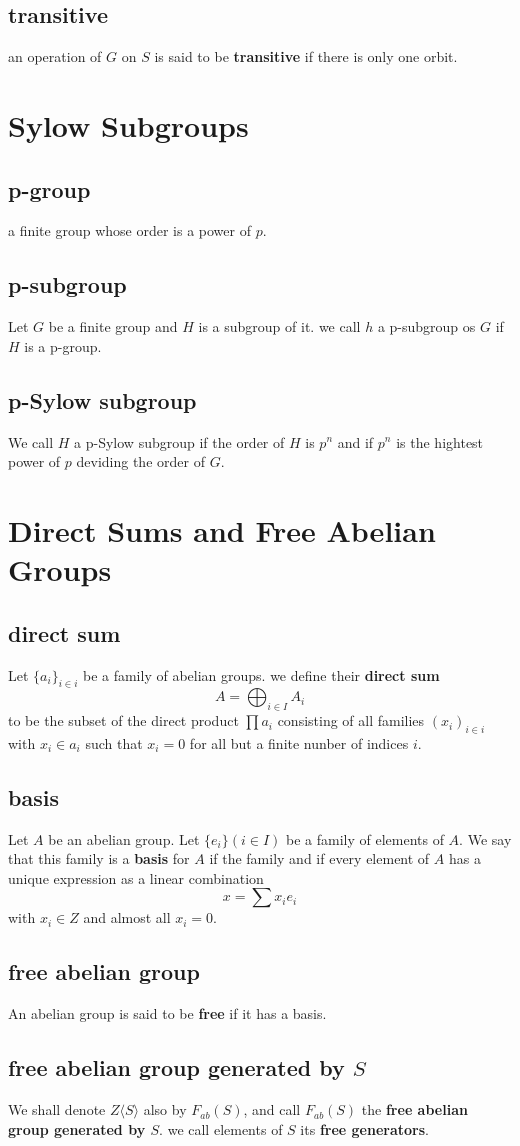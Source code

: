 \documentclass[11pt]{article}
\begin{document}
\subsection{transitive}
\label{sec:orgd37bdce}
an operation of \(G\) on \(S\) is said to be \textbf{transitive}
if there is only one orbit.
\section{Sylow Subgroups}
\label{sec:org4fd7db4}
\subsection{p-group}
\label{sec:org74896a6}
a finite group whose order is a power of \(p\).
\subsection{p-subgroup}
\label{sec:org1f1c931}
Let \(G\) be a finite group and \(H\) is a subgroup of it.
we call \(h\) a p-subgroup os \(G\) if \(H\) is a p-group.
\subsection{p-Sylow subgroup}
\label{sec:org121c4cd}
We call \(H\) a p-Sylow subgroup if the order of \(H\) is \(p^n\) and if \(p^n\) is the hightest
power of \(p\) deviding the order of \(G\).
\section{Direct Sums and Free Abelian Groups}
\label{sec:orgfdf007b}
\subsection{direct sum}
\label{sec:org161cffe}
Let \(\{a_i\}_{i\in i}\) be a family of abelian groups. we define their \textbf{direct sum}
\[A = \bigoplus_{i\in I} A_i\] to be the subset of the direct product \(\prod a_i\) consisting of all 
families \((x_i)_{i\in i}\) with \(x_i\in a_i\) such that \(x_i = 0\) for all but a 
finite nunber of indices \(i\).
\subsection{basis}
\label{sec:org2880a1e}
Let \(A\) be an abelian group. Let \(\{e_i\}(i\in I)\) be a family of elements of
\(A\). We say that this family is a \textbf{basis} for \(A\) if the family
and if every element of \(A\) has a unique expression as a linear combination
\[ x = \sum x_ie_i \] with \(x_i\in Z\) and almost all \(x_i = 0\).
\subsection{free abelian group}
\label{sec:org02c603a}
An abelian group is said to be \textbf{free} if it has a basis.
\subsection{free abelian group generated by \(S\)}
\label{sec:org8e5f4ff}
We shall denote \(Z\langle S \rangle\) also by \(F_{ab}(S)\), 
and call \(F_{ab}(S)\) the \textbf{free abelian group generated by \(S\)}.
we call elements of \(S\) its \textbf{free generators}.
\end{document}
